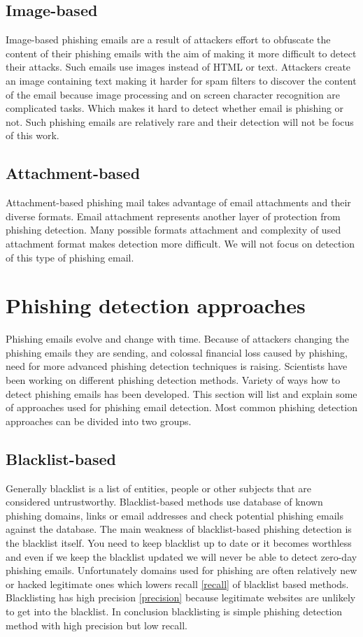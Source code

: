 \documentclass[thesis=B,english]{FITthesis}[2012/10/20]
\begin{document}
\subsection{Image-based}
Image-based phishing emails are a result of attackers effort to obfuscate the content of their phishing emails with the aim of making it more difficult to detect their attacks. Such emails use images instead of HTML or text. Attackers create an image containing text making it harder for spam filters to discover the content of the email because image processing and on screen character recognition are complicated tasks. Which makes it hard to detect whether email is phishing or not. Such phishing emails are relatively rare and their detection will not be focus of this work.
\subsection{Attachment-based}
Attachment-based phishing mail takes advantage of email attachments and their diverse formats. Email attachment represents another layer of protection from phishing detection. Many possible formats attachment and complexity of used attachment format makes detection more difficult. We will not focus on detection of this type of phishing email.

\section{Phishing detection approaches}
Phishing emails evolve and change with time. Because of attackers changing the phishing emails they are sending, and colossal financial loss caused by phishing, need for more advanced phishing detection techniques is raising. Scientists have been working on different phishing detection methods. Variety of ways how to detect phishing emails has been developed. This section will list and explain some of approaches used for phishing email detection. Most common phishing detection approaches can be divided into two groups.

\subsection{Blacklist-based}
Generally blacklist is a list of entities, people or other subjects that are considered untrustworthy. Blacklist-based methods use database of known phishing domains, links or email addresses and check potential phishing emails against the database. The main weakness of blacklist-based phishing detection is the blacklist itself. You need to keep blacklist up to date or it becomes worthless and even if we keep the blacklist updated we will never be able to detect zero-day phishing emails. Unfortunately domains used for phishing are often relatively new or hacked legitimate ones \cite{almomani2013phishing} which lowers recall \ref{recall} of blacklist based methods. Blacklisting has high precision \ref{precision} because legitimate websites are unlikely to get into the blacklist. In conclusion blacklisting is simple phishing detection method with high precision but low recall. 
\end{document}
